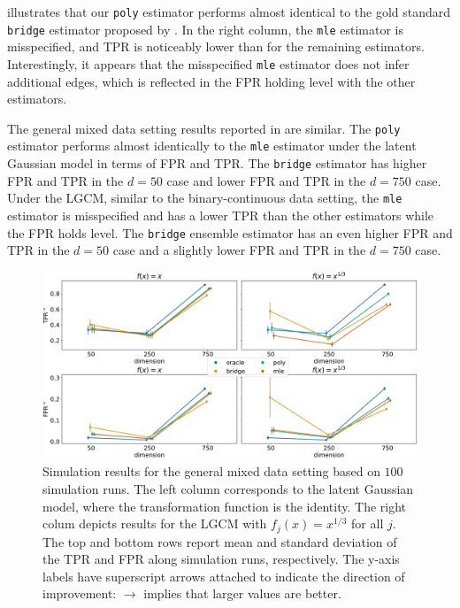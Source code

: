  illustrates that our \texttt{poly} estimator performs almost identical to the gold standard \texttt{bridge} estimator proposed by \citet{Fan17}. In the right column, the \texttt{mle} estimator is misspecified, and TPR is noticeably lower than for the remaining estimators. Interestingly, it appears that the misspecified \texttt{mle} estimator does not infer additional edges, which is reflected in the FPR holding level with the other estimators.

The general mixed data setting results reported in  are similar. The \texttt{poly} estimator performs almost identically to the \texttt{mle} estimator under the latent Gaussian model in terms of FPR and TPR. The \texttt{bridge} estimator has higher FPR and TPR in the \(d=50\) case and lower FPR and TPR in the \(d=750\) case. Under the LGCM, similar to the binary-continuous data setting, the \texttt{mle} estimator is misspecified and has a lower TPR than the other estimators while the FPR holds level. The \texttt{bridge} ensemble estimator has an even higher FPR and TPR in the \(d=50\) case and a slightly lower FPR and TPR in the \(d=750\) case.
\begin{figure}
    \centering
    \includegraphics[width=\textwidth]{Figures/general_fpr_tpr.pdf}
    \caption{Simulation results for the general mixed data setting based on \(100\) simulation runs. The left column corresponds to the latent Gaussian model, where the transformation function is the identity. The right colum depicts results for the LGCM with \(f_j(x) = x^{1/3}\) for all \(j\). The top and bottom rows report mean and standard deviation of the TPR and FPR along simulation runs, respectively. The y-axis labels have superscript arrows attached to indicate the direction of improvement: \(\rightarrow\) implies that larger values are better.}
    \label{fig:bench_tpr_fpr_general}
\end{figure}

